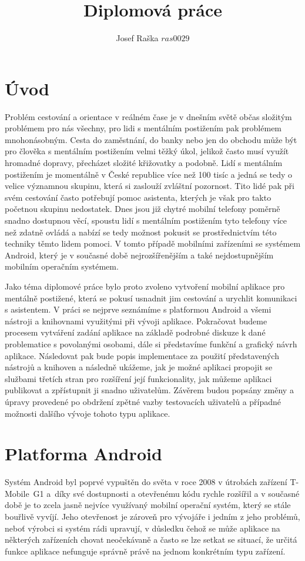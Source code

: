 \documentclass[czech,master,public,dept460,male,java,cpdeclaration]{diploma}
\title{Diplomová práce}
\author{Josef Raška \(ras0029\)}
\begin{document}
\MakeTitlePages
{}


\newpage

\section{Úvod}
Problém cestování a orientace v reálném čase je v dnešním světě občas složitým problémem pro nás všechny,
pro lidi s mentálním postižením pak problémem mnohonásobným. Cesta do zaměstnání, do banky
nebo jen do obchodu může být pro člověka s mentálním postižením velmi těžký úkol, jelikož často musí
využít hromadné dopravy, přecházet složité křižovatky a podobně. Lidí s mentálním postižením
je momentálně v České republice více než 100 tisíc \cite{komunikace} a jedná se tedy o velice
významnou skupinu, která si zaslouží zvláštní pozornost. Tito lidé pak při svém cestování často potřebují
pomoc asistenta, kterých je však pro takto početnou skupinu nedostatek.
Dnes jsou již chytré mobilní telefony poměrně snadno dostupnou věcí, spoustu lidí
s mentálním postižením tyto telefony více než zdatně ovládá a nabízí se tedy možnost pokusit se prostřednictvím
 této techniky těmto lidem pomoci. V tomto případě mobilními zařízeními se systémem Android,
 který je v současné době nejrozšířenějším a také nejdostupnějším mobilním operačním systémem.

Jako téma diplomové práce bylo proto zvoleno vytvoření mobilní aplikace pro mentálně postižené,
 která se pokusí usnadnit jim cestování a urychlit komunikaci s asistentem. V práci se nejprve
 seznámíme s platformou Android a všemi nástroji a knihovnami využitými při vývoji aplikace.
 Pokračovat budeme procesem vytváření zadání aplikace na základě podrobné diskuze k dané problematice s povolanými osobami,
 dále si představíme funkční a grafický návrh aplikace.
 Následovat pak bude popis implementace za použití představených nástrojů a knihoven a následně ukážeme,
 jak je možné aplikaci propojit se službami třetích stran pro rozšíření její funkcionality, jak
 můžeme aplikaci publikovat a zpřístupnit ji snadno uživatelům. Závěrem budou popsány
 změny a úpravy provedené po obdržení zpětné vazby testovacích uživatelů a případné možnosti dalšího vývoje tohoto typu aplikace.


\section{Platforma Android}
Systém Android byl poprvé vypuštěn do světa v roce 2008 v útrobách zařízení T-Mobile~G1 \cite{androidcentral}
a~díky své dostupnosti a otevřenému kódu rychle rozšířil a v současné době je to zcela jasně nejvíce využívaný mobilní
operační systém, který se stále bouřlivě vyvíjí. Jeho otevřenost je zároveň pro vývojáře i jedním z jeho problémů,
neboť výrobci si systém rádi upravují, v důsledku čehož se může aplikace na některých zařízeních chovat
neočekávaně a často se lze setkat se situací, že určitá funkce aplikace nefunguje správně právě na
jednom konkrétním typu zařízení.
\end{document}
